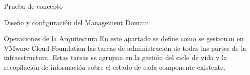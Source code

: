 \begin{section}{Prueba de concepto}
\begin{subsection}{Diseño y configuración del Management Domain}
    
    
    \end{subsection}
    
    
    \begin{subsection}{Operaciones de la Arquitectura\cite{CFopermanagement}}
    En este apartado se define como se gestionan en VMware Cloud Foundation las tareas de administración de todas las partes de la infraestructura. Estas tareas se agrupan en la gestión del ciclo de vida y la recopilación de información sobre el estado de cada componente existente.
    

\end{subsection}
\end{section}
